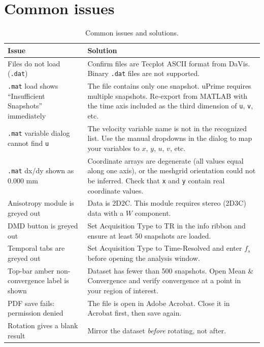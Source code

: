 \documentclass[11pt, a4paper]{report}
\newcommand{\software}[1]{\textsf{#1}}
\begin{document}
\section{Common issues}

\begin{table}[htbp]
\centering
\caption{Common issues and solutions.}
\begin{tabular}{p{5.2cm}p{8.8cm}}
\toprule
\textbf{Issue} & \textbf{Solution} \\
\midrule
Files do not load (\texttt{.dat}) & Confirm files are Tecplot ASCII format from DaVis. Binary \texttt{.dat} files are not supported. \\
\addlinespace
\texttt{.mat} load shows ``Insufficient Snapshots'' immediately & The file contains only one snapshot. \software{uPrime} requires multiple snapshots. Re-export from MATLAB with the time axis included as the third dimension of \texttt{u}, \texttt{v}, etc. \\
\addlinespace
\texttt{.mat} variable dialog cannot find \texttt{u} & The velocity variable name is not in the recognized list. Use the manual dropdowns in the dialog to map your variables to $x$, $y$, $u$, $v$, etc. \\
\addlinespace
\texttt{.mat} dx/dy shown as 0.000 mm & Coordinate arrays are degenerate (all values equal along one axis), or the meshgrid orientation could not be inferred. Check that \texttt{x} and \texttt{y} contain real coordinate values. \\
\addlinespace
Anisotropy module is greyed out & Data is 2D2C. This module requires stereo (2D3C) data with a $W$ component. \\
\addlinespace
DMD button is greyed out & Set Acquisition Type to TR in the info ribbon and ensure at least 50 snapshots are loaded. \\
\addlinespace
Temporal tabs are greyed out & Set Acquisition Type to Time-Resolved and enter $f_s$ before opening the analysis window. \\
\addlinespace
Top-bar amber non-convergence label is shown & Dataset has fewer than 500 snapshots. Open Mean \& Convergence and verify convergence at a point in your region of interest. \\
\addlinespace
PDF save fails: permission denied & The file is open in Adobe Acrobat. Close it in Acrobat first, then save again. \\
\addlinespace
Rotation gives a blank result & Mirror the dataset \emph{before} rotating, not after. \\

\end{tabular}
\end{table}
\end{document}
